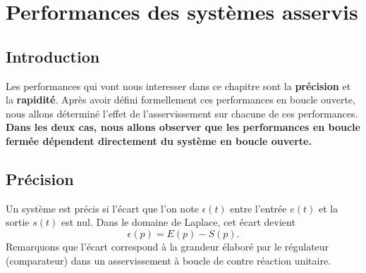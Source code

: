 \chapter[Performances des systèmes]
{Performances des systèmes asservis\label{chap-perf}}
\minitoc
\newpage
\section{Introduction}
Les performances qui vont nous interesser dans 
ce chapitre sont la \textbf{précision} et la \textbf{rapidité}.
Après avoir défini formellement ces performances en boucle ouverte, 
nous allons déterminé l'effet de l'asservissement sur chacune de 
ces performances. \textbf{Dans les deux cas, nous allons observer que 
les performances en boucle fermée dépendent directement du système 
en boucle ouverte.}
\section{Précision}
Un système est précis si l'écart que l'on note $\epsilon(t)$ 
entre l'entrée $e(t)$ et la sortie $s(t)$ est nul.
Dans le domaine de Laplace, cet écart devient 
\[
\epsilon(p)=E(p)-S(p).
\]
Remarquons que l'écart correspond à la grandeur élaboré par le régulateur 
(comparateur) dans un asservissement à boucle de contre réaction unitaire.

